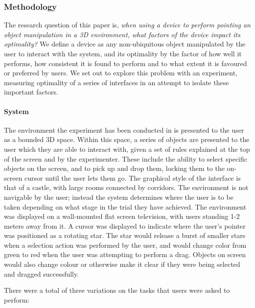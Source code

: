 \subsubsection{Methodology}

The research question of this paper is, \textit{when using a device to perform pointing an object manipulation in a 3D environment, what factors of the device impact its optimality?} We define a device as any non-ubiquitous object manipulated by the user to interact with the system, and its optimality by the factor of how well it performs, how consistent it is found to perform and to what extent it is favoured or preferred by users. We set out to explore this problem with an experiment, measuring optimality of a series of interfaces in an attempt to isolate these important factors.

\paragraph{System}

The environment the experiment has been conducted in is presented to the user as a bounded 3D space. Within this space, a series of objects are presented to the user which they are able to interact with, given a set of rules explained at the top of the screen and by the experimenter. These include the ability to select specific objects on the screen, and to pick up and drop them, locking them to the on-screen cursor until the user lets them go. The graphical style of the interface is that of a castle, with large rooms connected by corridors. The environment is not navigable by the user; instead the system determines where the user is to be taken depending on what stage in the trial they have achieved. The environment was displayed on a wall-mounted flat screen television, with users standing 1-2 meters away from it. A cursor was displayed to indicate where the user’s pointer was positioned as a rotating star. The star would release a burst of smaller stars when a selection action was performed by the user, and would change color from green to red when the user was attempting to perform a drag. Objects on screen would also change colour or otherwise make it clear if they were being selected and dragged successfully. 

There were a total of three variations on the tasks that users were asked to perform:

